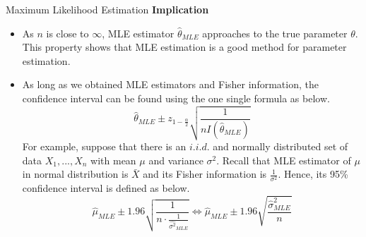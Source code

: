 \documentclass[12pt]{article}
\begin{document}
\begin{section}{Maximum Likelihood Estimation}
\textbf{Implication}
\begin{itemize}
	\item As $n$ is close to $\infty$, MLE estimator $\hat{\theta}_{MLE}$ approaches to the true parameter $\theta$. This property shows that MLE estimation is a good method for parameter estimation.
    \item As long as we obtained MLE estimators and Fisher information, the confidence interval can be found using the one single formula as below.
    $$\hat{\theta}_{MLE} \pm z_{1-\frac{\alpha}{2}}\sqrt{\frac{1}{nI(\hat{\theta}_{MLE})}}$$
    For example, suppose that there is an $i.i.d.$ and normally distributed set of data $X_1,...,X_n$ with mean $\mu$ and variance $\sigma^2$. Recall that MLE estimator of $\mu$ in normal distribution is $\bar{X}$ and its Fisher information is $\frac{1}{\sigma^2}$. Hence, its 95\% confidence interval is defined as below.
$$\hat{\mu}_{MLE} \pm 1.96\sqrt{\frac{1}{n\cdot\frac{1}{\hat{\sigma^2}_{MLE}}}} \Leftrightarrow \hat{\mu}_{MLE} \pm 1.96\sqrt{\frac{\hat{\sigma}^2_{MLE}}{n}}$$
\end{itemize}








\end{section}
\end{document}
